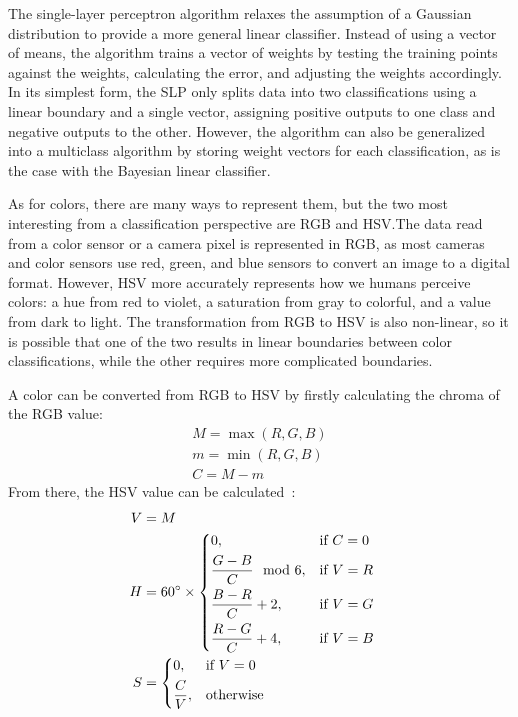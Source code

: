 \documentclass[twoside]{IEEEtran}
\begin{document}
The single-layer perceptron algorithm relaxes the assumption of a Gaussian distribution to
provide a more general linear classifier. Instead of using a vector of means, the algorithm trains a
vector of weights by testing the training points against the weights, calculating the error, and
adjusting the weights accordingly. In its simplest form, the SLP only splits data into two
classifications using a linear boundary and a single vector, assigning positive outputs to one class
and negative outputs to the other. However, the algorithm can also be generalized into a multiclass
algorithm by storing weight vectors for each classification, as is the case with the Bayesian linear
classifier.

As for colors, there are many ways to represent them, but the two most interesting from a
classification perspective are RGB and HSV.\@ The data read from a color sensor or a camera pixel
is represented in RGB, as most cameras and color sensors use red, green, and blue sensors to
convert an image to a digital format. However, HSV more accurately represents how we humans
perceive colors: a hue from red to violet, a saturation from gray to colorful, and a value from
dark to light. The transformation from RGB to HSV is also non-linear, so it is possible that one
of the two results in linear boundaries between color classifications, while the other requires
more complicated boundaries.

A color can be converted from RGB to HSV by firstly calculating the chroma of the RGB value:
\begin{align*}
     & M = \max\left(R, G, B\right) & \\
     & m = \min\left(R, G, B\right) & \\
     & C = M - m                    &
\end{align*}
From there, the HSV value can be calculated~\cite{hsv}:
\begin{align*}
    V & = M                                           &              \\
    H & = 60^\circ \times \begin{dcases}
                              0,                      & \text{if } C = 0 \\
                              \frac{G - B}{C} \mod 6, & \text{if } V = R \\
                              \frac{B - R}{C} + 2,    & \text{if } V = G \\
                              \frac{R - G}{C} + 4,    & \text{if } V = B
                          \end{dcases} & \\
    S & = \begin{dcases}
              0,           & \text{if } V = 0 \\
              \frac{C}{V}, & \text{otherwise}
          \end{dcases}            &
\end{align*}
\end{document}
